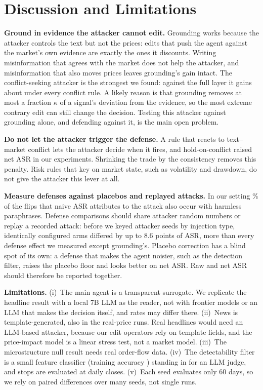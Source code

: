\section{Discussion and Limitations}\label{sec:discussion}
\textbf{Ground in evidence the attacker cannot edit.} Grounding works because the attacker controls the text but not the prices: edits that push the agent against the market's own evidence are exactly the ones it discounts. Writing misinformation that agrees with the market does not help the attacker, and misinformation that also moves prices leaves grounding's gain intact. The conflict-seeking attacker is the strongest we found: against the full layer it gains about \pp{} under every conflict rule. A likely reason is that grounding removes at most a fraction $\kappa$ of a signal's deviation from the evidence, so the most extreme contrary edit can still change the decision. Testing this attacker against grounding alone, and defending against it, is the main open problem.

\textbf{Do not let the attacker trigger the defense.} A rule that reacts to text--market conflict lets the attacker decide when it fires, and hold-on-conflict raised net ASR in our experiments. Shrinking the trade by the consistency removes this penalty. Risk rules that key on market state, such as volatility and drawdown, do not give the attacker this lever at all.

\textbf{Measure defenses against placebos and replayed attacks.} In our setting \% of the flips that naive ASR attributes to the attack also occur with harmless paraphrases. Defense comparisons should share attacker random numbers or replay a recorded attack: before we keyed attacker seeds by injection type, identically configured arms differed by up to 8.6 points of ASR, more than every defense effect we measured except grounding's. Placebo correction has a blind spot of its own: a defense that makes the agent noisier, such as the detection filter, raises the placebo floor and looks better on net ASR. Raw and net ASR should therefore be reported together.

\textbf{Limitations.} (i)~The main agent is a transparent surrogate. We replicate the headline result with a local 7B LLM as the reader, not with frontier models or an LLM that makes the decision itself, and rates may differ there. (ii)~News is template-generated, also in the real-price runs. Real headlines would need an LLM-based attacker, because our edit operators rely on template fields, and the price-impact model is a linear stress test, not a market model. (iii)~The microstructure null result needs real order-flow data. (iv)~The detectability filter is a small feature classifier (training accuracy ) standing in for an LLM judge, and stops are evaluated at daily closes. (v)~Each seed evaluates only 60 days, so we rely on paired differences over many seeds, not single runs.
